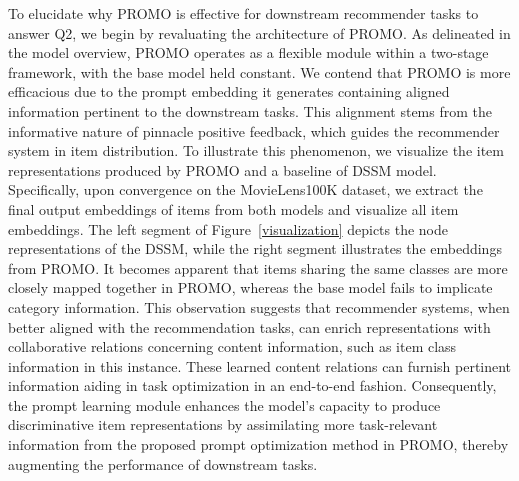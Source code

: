 \documentclass[sigconf]{acmart}
\newcommand{\sys}{\textsc{PROMO}\xspace}
\begin{document}
To elucidate why \sys is effective for downstream recommender tasks to answer Q2, we begin by revaluating the architecture of \sys. 
As delineated in the model overview, \sys operates as a flexible module within a two-stage framework, with the base model held constant. 
We contend that \sys is more efficacious due to the prompt embedding it generates containing aligned information pertinent to the downstream tasks. 
This alignment stems from the informative nature of pinnacle positive feedback, which guides the recommender system in item distribution. 
To illustrate this phenomenon, we visualize the item representations produced by \sys and a baseline of DSSM model. 
Specifically, upon convergence on the MovieLens100K dataset, we extract the final output embeddings of items from both models and visualize all item embeddings. 
The left segment of Figure~\ref{visualization} depicts the node representations of the DSSM, while the right segment illustrates the embeddings from \sys. 
It becomes apparent that items sharing the same classes are more closely mapped together in \sys, whereas the base model fails to implicate category information. 
This observation suggests that recommender systems, when better aligned with the recommendation tasks, can enrich representations with collaborative relations concerning content information, such as item class information in this instance. 
These learned content relations can furnish pertinent information aiding in task optimization in an end-to-end fashion. 
Consequently, the prompt learning module enhances the model's capacity to produce discriminative item representations by assimilating more task-relevant information from the proposed prompt optimization method in \sys, thereby augmenting the performance of downstream tasks.
\end{document}
